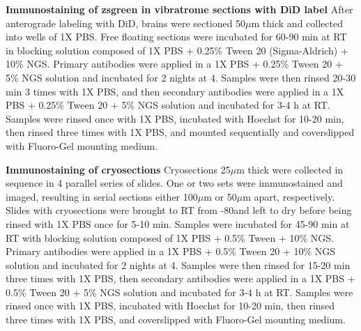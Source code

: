 \noindent\textbf{Immunostaining of zsgreen in vibratrome sections with DiD label} \newline
\indent After anterograde labeling with DiD, brains were sectioned 50$\mu$m thick and collected into wells of 1X PBS.
Free floating sections were incubated for 60-90 min at RT in blocking solution composed of 1X PBS + 0.25\% Tween 20 (Sigma-Aldrich) + 10\% NGS.
Primary antibodies were applied in a 1X PBS + 0.25\% Tween 20 + 5\% NGS solution and incubated for 2 nights at 4\textcelsius.
Samples were then rinsed 20-30 min 3 times with 1X PBS, and then secondary antibodies were applied in a 1X PBS + 0.25\% Tween 20 + 5\% NGS solution and incubated for 3-4 h at RT.
Samples were rinsed once with 1X PBS, incubated with Hoechst for 10-20 min, then rinsed three times with 1X PBS, and mounted sequentially and coverslipped with Fluoro-Gel mounting medium.

\noindent\textbf{Immunostaining of cryosections} \newline
\indent Cryosections 25$\mu$m thick were collected in sequence in 4 parallel series of slides.
One or two sets were immunostained and imaged, resulting in serial sections either 100$\mu$m or 50$\mu$m apart, respectively.
Slides with cryosections were brought to RT from -80\textcelsius and left to dry before being rinsed with 1X PBS once for 5-10 min.
Samples were incubated for 45-90 min at RT with blocking solution composed of 1X PBS + 0.5\% Tween + 10\% NGS.
Primary antibodies were applied in a 1X PBS + 0.5\% Tween 20 + 10\% NGS solution and incubated for 2 nights at 4\textcelsius.
Samples were then rinsed for 15-20 min three times with 1X PBS, then secondary antibodies were applied in a 1X PBS + 0.5\% Tween 20 + 5\% NGS solution and incubated for 3-4 h at RT.
Samples were rinsed once with 1X PBS, incubated with Hoechst for 10-20 min, then rinsed three times with 1X PBS, and coverslipped with Fluoro-Gel mounting medium.